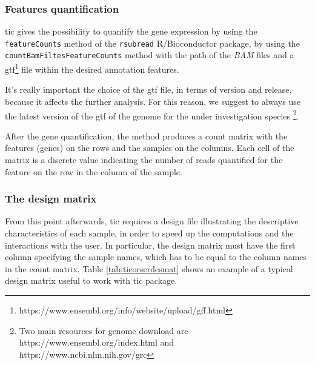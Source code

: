 \subsubsection{Features quantification}
\gls{tic} gives the possibility to quantify the gene expression by using the \lstinline!featureCounts! method of the \lstinline!rsubread! R/Bioconductor package, by using the \lstinline!countBamFiltesFeatureCounts! method with the path of the \textit{BAM} files and a \gls{gtf}\footnote{https://www.ensembl.org/info/website/upload/gff.html} file within the desired annotation features.

It's really important the choice of the \gls{gtf} file, in terms of version and release, because it affects the further analysis. For this reason, we suggest to always use the latest version of the \gls{gtf} of the genome for the under investigation species \footnote{Two main resources for genome download are https://www.ensembl.org/index.html and https://www.ncbi.nlm.nih.gov/grc}. 

After the gene quantification, the method produces a count matrix with the features (genes) on the rows and the samples on the columns. 
Each cell of the matrix is a discrete value indicating the number of reads quantified for the feature on the row in the column of the sample. 

\subsubsection{The design matrix}
From this point afterwards, \gls{tic} requires a design file illustrating the descriptive characteristics of each sample, in order to speed up the computations and the interactions with the user.
In particular, the design matrix must have the first column specifying the sample names, which has to be equal to the column names in the count matrix.
Table \ref{tab:ticorserdesmat} shows an example of a typical design matrix useful to work with \gls{tic} package.

